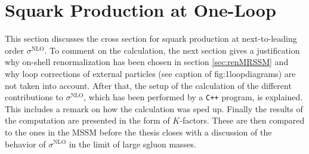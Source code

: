 \section{Squark Production at One-Loop}
This section discusses the cross section for squark production at next-to-leading order $\sigma^{\mathrm{NLO}}$. To comment on the calculation, the next section gives a justification why on-shell renormalization has been chosen in section \ref{sec:renMRSSM} and why loop corrections of external particles (see caption of {fig:1loopdiagrams}) are not taken into account. After that, the setup of the calculation of the different contributions to $\sigma^{\mathrm{NLO}}$, which has been performed by a \texttt{C++} program, is explained. This includes a remark on how the calculation was sped up. Finally the results of the computation are presented in the form of $K$-factors. These are then compared to the ones in the MSSM before the thesis closes with a discussion of the behavior of $\sigma^{\mathrm{NLO}}$ in the limit of large sgluon masses.

